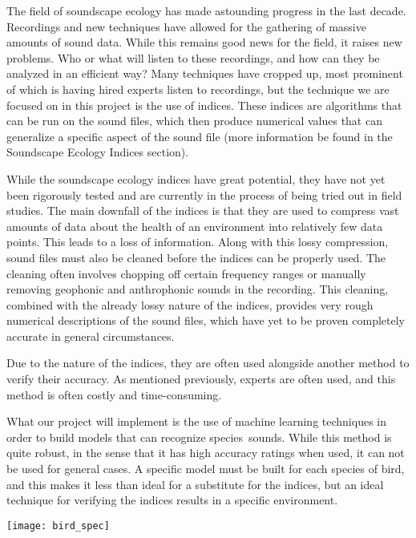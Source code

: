 The field of soundscape ecology has made astounding progress in the last decade.
Recordings and new techniques have allowed for the gathering of massive amounts of sound data. While this remains good news for the field, it raises new problems. Who or what will listen to these recordings, and how can they be analyzed in an efficient way? Many techniques have cropped up, most prominent of which is having hired experts listen to recordings, but the technique we are focused on in this project is the use of indices. These indices are algorithms that can be run on the sound files, which then produce numerical values that can generalize a specific aspect of the sound file (more information be found in the Soundscape Ecology Indices section).\par
While the soundscape ecology indices have great potential, they have not yet been rigorously tested and are currently in the process of being tried out in field studies. The main downfall of the indices is that they are used to compress vast amounts of data about the health of an environment into relatively few data points. This leads to a loss of information. Along with this lossy compression, sound files must also be cleaned before the indices can be properly used. The cleaning often involves chopping off certain frequency ranges or manually removing geophonic and anthrophonic sounds in the recording. This cleaning, combined with the already lossy nature of the indices, provides very rough numerical descriptions of the sound files, which have yet to be proven completely accurate in general circumstances.\par
Due to the nature of the indices, they are often used alongside another method to verify their accuracy. As mentioned previously, experts are often used, and this method is often costly and time-consuming.\par
What our project will implement is the use of machine learning techniques in order to build models that can recognize species\textquotesingle\ sounds. While this method is quite robust, in the sense that it has high accuracy ratings when used, it can not be used for general cases. A specific model must be built for each species of bird, and this makes it less than ideal for a substitute for the indices, but an ideal technique for verifying the indices results in a specific environment.\par
\begin{center}
	\texttt{[image: bird\_spec]}
\end{center}

